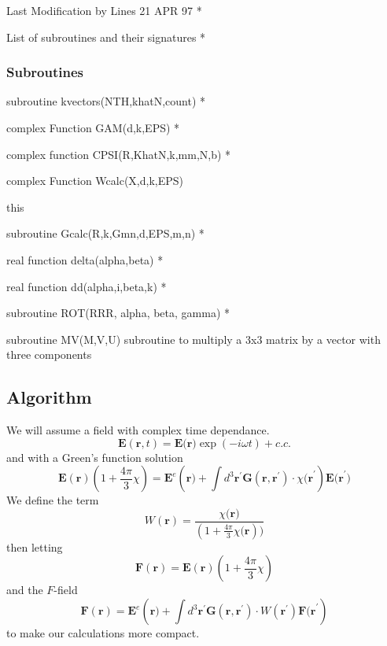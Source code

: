 \documentclass{article}
\begin{document}
Last Modification by Lines 21 APR 97 *

List of subroutines and their signatures *

\subsubsection{Subroutines}

subroutine kvectors(NTH,khatN,count) *

complex Function GAM(d,k,EPS) *

complex function CPSI(R,KhatN,k,mm,N,b) *

complex Function Wcalc(X,d,k,EPS)

this

subroutine Gcalc(R,k,Gmn,d,EPS,m,n) *

real function delta(alpha,beta) *

real function dd(alpha,i,beta,k) *

subroutine ROT(RRR, alpha, beta, gamma) *

subroutine MV(M,V,U) subroutine to multiply a 3x3 matrix by a vector with
three components

\subsection{Algorithm}

We will assume a field with complex time dependance.%
\begin{equation}
\mathbf{E}\left( \mathbf{r},t\right) =\mathbf{E(r})\exp (-i\omega t)+c.c.
\label{Field}
\end{equation}%
and with a Green's function solution 
\begin{equation}
\mathbf{E}(\mathbf{r})(1+\frac{4\pi }{3}\chi )=\mathbf{E}^{e}(\mathbf{r)+}%
\int d^{3}\mathbf{r}^{\prime }\mathbf{G}\left( \mathbf{r},\mathbf{r}^{\prime
}\right) \cdot \chi \mathbf{(r}^{\prime })\mathbf{E(r}^{\prime })
\label{E-field}
\end{equation}%
We define the term%
\begin{equation}
W\left( \mathbf{r}\right) =\frac{\chi \mathbf{(r})}{(1+\frac{4\pi }{3}\chi 
\mathbf{(r}))}  \label{W1}
\end{equation}%
then letting 
\[
\mathbf{F}(\mathbf{r})=\mathbf{E}(\mathbf{r})(1+\frac{4\pi }{3}\chi ) 
\]%
and the $F$-field 
\begin{equation}
\mathbf{F}(\mathbf{r})=\mathbf{E}^{e}(\mathbf{r)+}\int d^{3}\mathbf{r}%
^{\prime }\mathbf{G}\left( \mathbf{r},\mathbf{r}^{\prime }\right) \cdot
W\left( \mathbf{r}^{\prime }\right) \mathbf{F(r}^{\prime })  \label{F-field}
\end{equation}
to make our calculations more compact.
\end{document}
